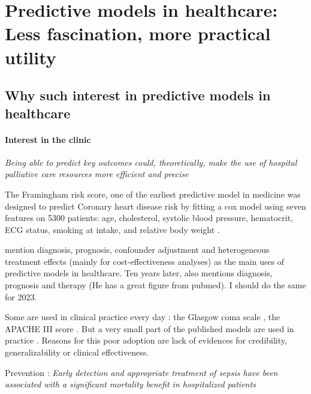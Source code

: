\documentclass[french,12pt,twoside,a4paper]{book}
\begin{document}
\clearpage
\minitoc

\section{Predictive models in healthcare: Less fascination, more practical utility}\label{sec:predictive_models:motivation}

\subsection{Why such interest in predictive models in healthcare}\label{subsec:predictive_models:importance}

\paragraph{Interest in the clinic}

\textit{Being able to predict key outcomes could, theoretically, make the use of
  hospital palliative care resources more efficient and precise} \citep{topol2019high}

The Framingham risk score, one of the earliest predictive model in medicine was
designed to predict Coronary heart disease risk by fitting a cox model using
seven features on 5300 patients: age, cholesterol, systolic blood pressure,
hematocrit, ECG status, smoking at intake, and relative body weight
\citep{brand1976multivariate}.

\citep{harrell2001regression} mention diagnosis, prognosis, confounder adjustment
and heterogeneous treatment effects (mainly for cost-effectiveness analyses) as
the main uses of predictive models in healthcare. Ten years later,
\citep{steyerberg2009applications} also mentions diagnosis, prognosis and therapy
(He has a great figure from pubmed). I should do the same for 2023.

Some are used in clinical practice every day : the Glasgow coma scale
\citep{teasdale1974assessment}, the APACHE III score \citep{knaus1991apache}.
But a very small part of the published models are used in practice
\citep{wyatt1995commentary}. Reasons for this poor adoption are lack of
evidences for credibility, generalizability or clinical effectiveness.

Prevention : \textit{Early detection and appropriate treatment of sepsis have
  been associated with a significant mortality benefit in hospitalized patients}
\citep{wong2021external}
\end{document}
